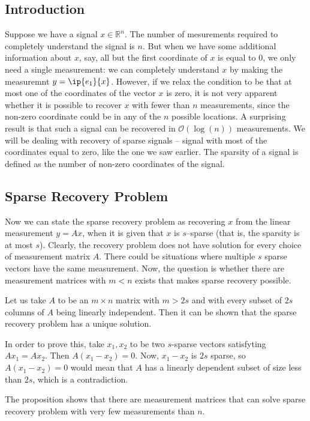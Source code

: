\subsection*{Introduction}
Suppose we have a signal $x\in \mathbb{R}^n$. The number
of mesurements required to completely understand the signal is
$n$. But when we have some additional information about $x$,
say, all but the first coordinate of $x$ is equal to $0$, we
only need a single measurement: we can completely understand
$x$ by making the measuremnt $y = \ip{e_1}{x}$. 
However, if we relax the condition to be that at most one
of the coordinates of the vector $x$ is zero, it is not
very apparent whether it is possible to recover $x$ with
fewer than $n$ measurements, since the non-zero coordinate
could be in any of the $n$ possible locations. A surprising
result is that such a signal can be recovered in
$\mathcal{O}(\log(n))$ measurements.
We will be dealing with recovery of sparse signals -- 
signal with most of the coordinates equal to zero,
like the one we saw earlier. The sparsity of a signal is
defined as the number of non-zero coordinates of the signal.


\subsection*{Sparse Recovery Problem}
Now we can state the sparse recovery problem as
recovering $x$ from the linear measurement $y = Ax$, when
it is given that $x$ is $s$--sparse (that is, the sparsity
is at most $s$). Clearly, the recovery problem
does not have solution for every choice of measurement matrix $A$.
There could be situations where multiple $s$ sparse vectors
have the same measurement. Now, the question is whether there are
measurement matrices with $m<n$ exists that makes sparse
recovery possible.

Let us take $A$ to be an $m\times n$ matrix with $m>2s$ and
with every subset of $2s$ columns of $A$ being linearly
independent. Then it can be shown that the sparse recovery problem
has a unique solution.

In order to prove this, take $x_1, x_2$ to be two $s$-sparse vectors
satisfyting $Ax_1 = Ax_2$. Then $A(x_1 - x_2) = 0$. Now, $x_1-x_2$ is
$2s$ sparse, so $A(x_1 - x_2) = 0$ would mean that $A$ has a linearly
dependent subset of size less than $2s$, which is a contradiction.

The proposition shows that there are measurement matrices that
can solve sparse recovery problem with very few measurements than $n$.

